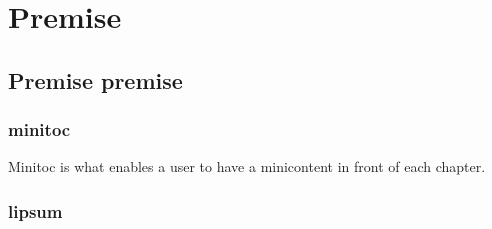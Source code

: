 
\chapter{Premise} \label{introduction}

\minitoc
\newpage


\section{Premise premise}

\subsection{minitoc}

Minitoc is what enables a user to have a minicontent in front of each chapter. 

\subsection{lipsum}

\lipsum
